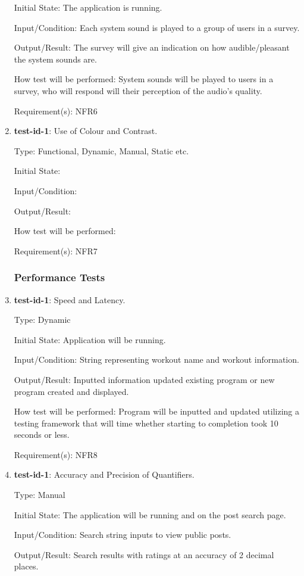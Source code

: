 \documentclass[12pt, titlepage]{article}
\begin{document}
\begin{enumerate}
		Initial State: The application is running.
		
		Input/Condition: Each system sound is played to a group of users in a survey.
		
		Output/Result: The survey will give an indication on how audible/pleasant the system sounds are.
		
		How test will be performed: System sounds will be played to users in a survey, who will respond will their perception of the audio's quality.
		
		Requirement(s): NFR6
		
		\item{\textbf{test-id-1}}: Use of Colour and Contrast.
		
		Type: Functional, Dynamic, Manual, Static etc.
		
		Initial State: 
		
		Input/Condition: 
		
		Output/Result: 
		
		How test will be performed: 
		
		Requirement(s): NFR7
	\subsubsection{Performance Tests}
		\item{\textbf{test-id-1}}: Speed and Latency.
		
		Type: Dynamic
		
		Initial State: Application will be running.
		
		Input/Condition: String representing workout name and workout information.
		
		Output/Result: Inputted information updated existing program or new program created and displayed.
		
		How test will be performed: Program will be inputted and updated utilizing a testing framework that will time whether starting to completion took 10 seconds or less. 
		
		Requirement(s): NFR8
		
		\item{\textbf{test-id-1}}: Accuracy and Precision of Quantifiers.
		
		Type: Manual
		
		Initial State: The application will be running and on the post search page.
		
		Input/Condition: Search string inputs to view public posts.
		
		Output/Result: Search results with ratings at an accuracy of 2 decimal places.
		

\end{enumerate}
\end{document}
